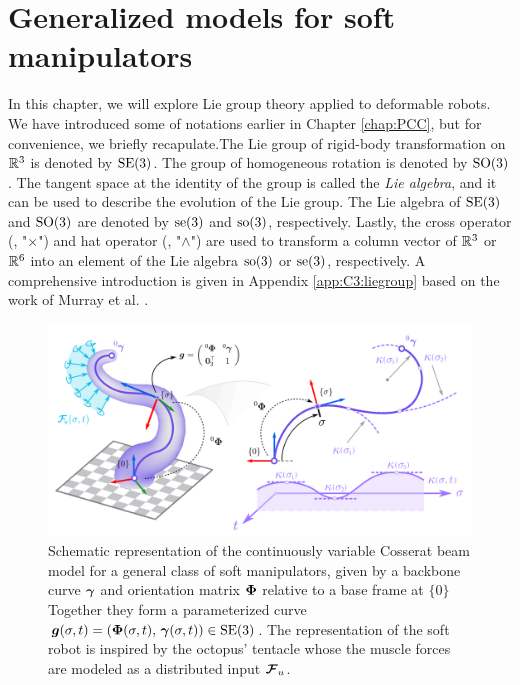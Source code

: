 \section{Generalized models for soft manipulators} \label{sec:chap3_model}
In this chapter, we will explore Lie group theory applied to deformable robots. We have introduced some of notations earlier in Chapter \ref{chap:PCC}, but for convenience, we briefly recapulate.The Lie group of rigid-body transformation on $\mathbb{R}^3$ is denoted by $\textup{\textrm{SE}}(3)$. The group of homogeneous rotation is denoted by $\textup{\textrm{SO}}(3)$. The tangent space at the identity of the group is called the \textit{Lie algebra}, and it can be used to describe the evolution of the Lie group. The Lie algebra of $\textup{\textrm{SE}}(3)$ and $\textup{\textrm{SO}}(3)$ are denoted by $\textup{\textrm{se}}(3)$ and $\textup{\textrm{so}}(3)$, respectively. Lastly, the cross operator (\ie, "$\times$") and hat operator (\ie, "$\wedge$") are used to transform a column vector of $\mathbb{R}^3$ or $\mathbb{R}^6$ into an element of the Lie algebra $\textup{\textrm{so}}(3)$ or $\textup{\textrm{se}}(3)$, respectively. A comprehensive introduction is given in Appendix \ref{app:C3:liegroup} based on the work of Murray et al. \cite{Murray1994}. 

\begin{figure}[!t]
  \vspace{-2mm}
  \centering
  \includegraphics[width = \textwidth]{./pdf/thesis-figure-5-1.pdf}
  \caption{Schematic representation of the continuously variable Cosserat beam model for a general class of soft manipulators, given by a backbone curve ${\boldsymbol{\gamma}}$ and orientation matrix ${\boldsymbol{\Phi}}$ relative to a base frame at $\{0\}$ Together they form a parameterized curve ${\boldsymbol{g}}(\sigma,t) = ({\boldsymbol{\Phi}}(\sigma,t),\, {\boldsymbol{\gamma}}(\sigma,t)) \in \textup{\textrm{SE}}(3)$. The representation of the soft robot is inspired by the octopus' tentacle whose the muscle forces are modeled as a distributed input ${\boldsymbol{\mathcal{F}}}_u$. \label{fig:C3:example1}}
\end{figure}

